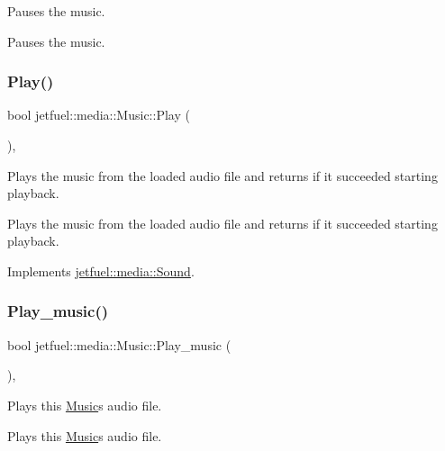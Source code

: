 Pauses the music. 

Pauses the music. \mbox{\label{classjetfuel_1_1media_1_1Music_afe9abee662a68ea9391e94e37c79945e}} 
\subsubsection{\texorpdfstring{Play()}{Play()}}
{\footnotesize\ttfamily bool jetfuel\+::media\+::\+Music\+::\+Play (\begin{DoxyParamCaption}{ }\end{DoxyParamCaption})\hspace{0.3cm}{\ttfamily [override]}, {\ttfamily [virtual]}}



Plays the music from the loaded audio file and returns if it succeeded starting playback. 

Plays the music from the loaded audio file and returns if it succeeded starting playback. 

Implements \hyperlink{classjetfuel_1_1media_1_1Sound_a8861a6671ce039522179d61085f240c8}{jetfuel\+::media\+::\+Sound}.

\mbox{\label{classjetfuel_1_1media_1_1Music_a298ce99e6d22e199d1642c21fd18a672}} 
\subsubsection{\texorpdfstring{Play\+\_\+music()}{Play\_music()}}
{\footnotesize\ttfamily bool jetfuel\+::media\+::\+Music\+::\+Play\+\_\+music (\begin{DoxyParamCaption}{ }\end{DoxyParamCaption})\hspace{0.3cm}{\ttfamily [inline]}, {\ttfamily [protected]}}



Plays this \hyperlink{classjetfuel_1_1media_1_1Music}{Music}\textquotesingle{}s audio file. 

Plays this \hyperlink{classjetfuel_1_1media_1_1Music}{Music}\textquotesingle{}s audio file. \mbox{\label{classjetfuel_1_1media_1_1Music_a0c8e12634e29cfe37138349776b6d9a8}} 
